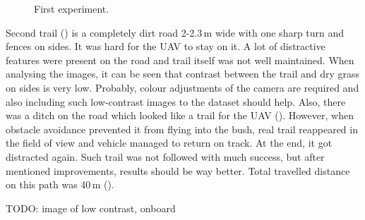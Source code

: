 \begin{figure}[!h]

  \centering

  \centering	
  


  \caption{First experiment.}
  \label{fig:first_trail_photos}
\end{figure}


Second trail () is a completely dirt road 2-2.3\,m wide with one sharp turn and fences on sides. It was hard for the \acs{UAV} to stay on it. A lot of distractive features were present on the road and trail itself was not well maintained. When analysing the images, it can be seen that contrast between the trail and dry grass on sides is very low. Probably, colour adjustments of the camera are required and also including such low-contrast images to the dataset should help. Also, there was a ditch on the road which looked like a trail for the \acs{UAV} (). However, when obstacle avoidance prevented it from flying into the bush, real trail reappeared in the field of view and vehicle managed to return on track. At the end, it got distracted again. Such trail was not followed with much success, but after mentioned improvements, results should be way better. Total travelled distance on this path was 40\,m ().

TODO: image of low contrast, onboard

